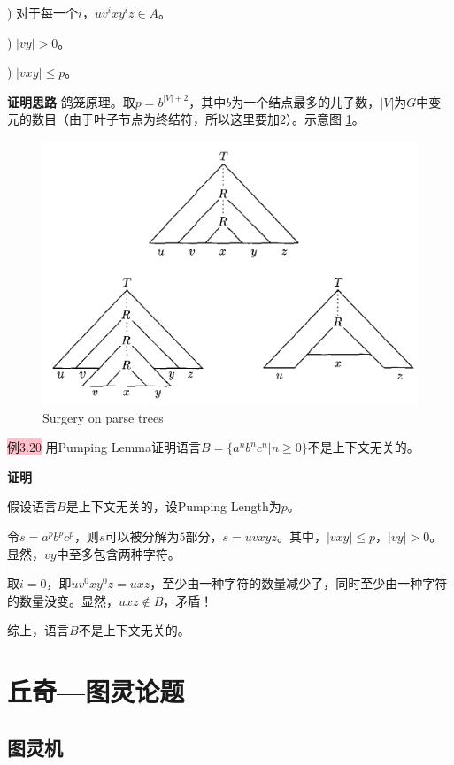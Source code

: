 \documentclass[a4paper]{article}
\begin{document}
	) 对于每一个$i$，$uv^ixy^iz \in A$。
	
	) $|vy| > 0$。
	
	) $|vxy| \leq p$。
	
	\textbf{证明思路} \quad 鸽笼原理。取$p=b^{|V|+2}$，其中$b$为一个结点最多的儿子数，$|V|$为$G$中变元的数目（由于叶子节点为终结符，所以这里要加$2$）。示意图 \ref{F030301}。
	
	\begin{figure}[htb]
		\centering
		\includegraphics[scale=0.8]{./figure/3.3.1.png}
		\caption{Surgery on parse trees}
		\label{F030301}
	\end{figure}
	
	\colorbox{pink}{例3.20} 用Pumping Lemma证明语言$B=\{a^nb^nc^n|n \geq 0\}$不是上下文无关的。
	
	\textbf{证明}
	
	假设语言$B$是上下文无关的，设Pumping Length为$p$。
	
	令$s=a^pb^pc^p$，则$s$可以被分解为$5$部分，$s=uvxyz$。其中，$|vxy| \leq p$，$|vy|>0$。显然，$vy$中至多包含两种字符。
	
	取$i=0$，即$uv^0xy^0z=uxz$，至少由一种字符的数量减少了，同时至少由一种字符的数量没变。显然，$uxz \notin B$，矛盾！
	
	综上，语言$B$不是上下文无关的。

\section{丘奇—图灵论题}

\subsection{图灵机}
\end{document}
